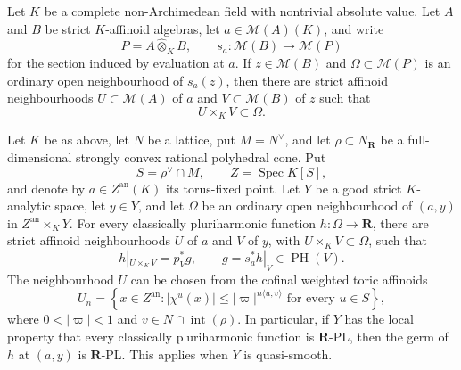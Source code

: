
\begin{lemma}
\label{lem:p061-product-open-tube}
Let \(K\) be a complete non-Archimedean field with nontrivial absolute
value.  Let \(A\) and \(B\) be strict \(K\)-affinoid algebras, let
\(a\in\mathcal M(A)(K)\), and write
\[
 P=A\widehat\otimes_KB,
 \qquad
 s_a:\mathcal M(B)\longrightarrow\mathcal M(P)
\]
for the section induced by evaluation at \(a\).  If
\(z\in\mathcal M(B)\) and \(\Omega\subset\mathcal M(P)\) is an ordinary
open neighbourhood of \(s_a(z)\), then there are strict affinoid
neighbourhoods \(U\subset\mathcal M(A)\) of \(a\) and
\(V\subset\mathcal M(B)\) of \(z\) such that
\[
                         U\times_KV\subset\Omega.
\]
\end{lemma}

\begin{proposition}
\label{prop:p061-parameterized-toric-fixed-fibre}
Let \(K\) be as above, let \(N\) be a lattice, put \(M=N^\vee\), and let
\(\rho\subset N_{\mathbf R}\) be a full-dimensional strongly convex
rational polyhedral cone.  Put
\[
 S=\rho^\vee\cap M,
 \qquad
 Z=\operatorname{Spec}K[S],
\]
and denote by \(a\in Z^{\mathrm{an}}(K)\) its torus-fixed point.  Let \(Y\)
be a good strict \(K\)-analytic space, let \(y\in Y\), and let
\(\Omega\) be an ordinary open neighbourhood of \((a,y)\) in
\(Z^{\mathrm{an}}\times_KY\).  For every classically pluriharmonic
function \(h:\Omega\to\mathbf R\), there are strict affinoid
neighbourhoods \(U\) of \(a\) and \(V\) of \(y\), with
\(U\times_KV\subset\Omega\), such that
\begin{equation}
\label{eq:p061-parameterized-toric-factorization}
 h|_{U\times_KV}
   =p_V^*g,
 \qquad
 g=s_a^*h|_V\in\operatorname{PH}(V).
\end{equation}
The neighbourhood \(U\) can be chosen from the cofinal weighted toric
affinoids
\begin{equation}
\label{eq:p061-parameterized-weighted-domain}
 U_n=\left\{x\in Z^{\mathrm{an}}:
  |\chi^u(x)|\leq|\varpi|^{n\langle u,v\rangle}
  \text{ for every }u\in S\right\},
\end{equation}
where \(0<|\varpi|<1\) and \(v\in N\cap\operatorname{int}(\rho)\).
In particular, if \(Y\) has the local property that every classically
pluriharmonic function is \(\mathbf R\)-PL, then the germ of \(h\) at
\((a,y)\) is \(\mathbf R\)-PL.  This applies when \(Y\) is quasi-smooth.
\end{proposition}


